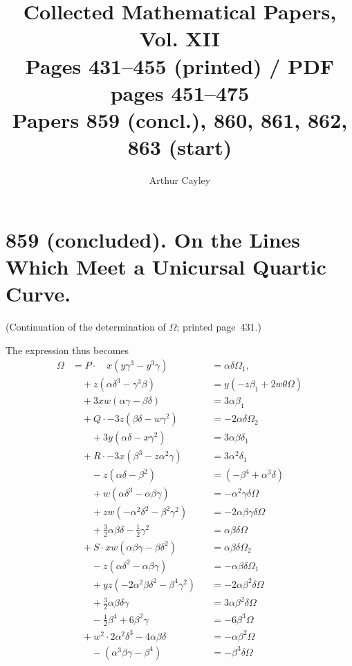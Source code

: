 \documentclass[11pt]{article}
\title{Collected Mathematical Papers, Vol. XII\\ \large Pages 431--455 (printed) / PDF pages 451--475\\ Papers 859 (concl.), 860, 861, 862, 863 (start)}
\author{Arthur Cayley}
\date{}
\begin{document}
\maketitle

\section*{859 (concluded). On the Lines Which Meet a Unicursal Quartic Curve.}

\noindent (Continuation of the determination of $\Omega$; printed page~431.)

\medskip

\noindent The expression thus becomes
\begin{align*}
\Omega &= P \cdot \quad x(y\gamma^3 - y^3\gamma) &&= \alpha\delta\Omega_1, \\
 &\quad + z(\alpha\delta^3 - \gamma^3\beta) &&= y(-z\beta_1 + 2w\theta\Omega) \\
 &\quad + 3xw(\alpha\gamma - \beta\delta) &&= 3\alpha\beta_1 \\
 &\quad + Q \cdot -3z(\beta\delta - w\gamma^2) &&= -2\alpha\delta\Omega_2 \\
 &\qquad + 3y(\alpha\delta - x\gamma^2) &&= 3\alpha\beta\delta_1 \\
 &\quad + R \cdot -3x(\beta^3 - z\alpha^2\gamma) &&= 3\alpha^2\delta_1 \\
 &\qquad - z(\alpha\delta - \beta^2) &&= (-\beta^4 + \alpha^3\delta) \\
 &\qquad + w(\alpha\delta^3 - \alpha\beta\gamma) &&= -\alpha^2\gamma\delta\Omega \\
 &\qquad + zw(-\alpha^2\delta^2 - \beta^2\gamma^2) &&= -2\alpha\beta\gamma\delta\Omega \\
 &\qquad + \tfrac{3}{2}\alpha\beta\delta - \tfrac{1}{2}\gamma^2 &&= \alpha\beta\delta\Omega \\
 &\quad + S \cdot xw(\alpha\beta\gamma - \beta\delta^2) &&= \alpha\beta\delta\Omega_2 \\
 &\qquad - z(\alpha\delta^2 - \alpha\beta\gamma) &&= -\alpha\beta\delta\Omega_1 \\
 &\qquad + yz(-2\alpha^2\beta\delta^2 - \beta^4\gamma^2) &&= -2\alpha\beta^2\delta\Omega \\
 &\qquad + \tfrac{3}{2}\alpha\beta\delta\gamma &&= 3\alpha\beta^2\delta\Omega \\
 &\qquad - \tfrac{1}{2}\beta^4 + 6\beta^2\gamma &&= -6\beta^3\Omega \\
 &\quad + w^2 \cdot 2\alpha^2\delta^3 - 4\alpha\beta\delta &&= -\alpha\beta^2\Omega \\
 &\qquad - (\alpha^3\beta\gamma - \beta^4) &&= -\beta^3\delta\Omega
\end{align*}
\end{document}
